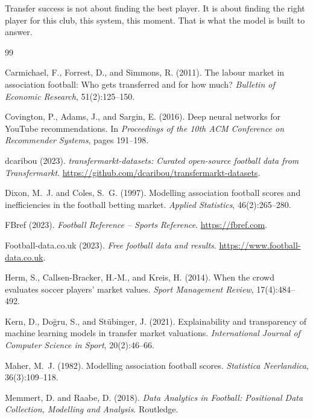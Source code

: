 \documentclass[12pt, a4paper, oneside]{report}
\begin{document}
Transfer success is not about finding the best player. It is about finding the right player for this club, this system, this moment. That is what the model is built to answer.


\begin{thebibliography}{99}

Carmichael, F., Forrest, D., and Simmons, R. (2011).
The labour market in association football: Who gets transferred and for how much?
\textit{Bulletin of Economic Research}, 51(2):125--150.

Covington, P., Adams, J., and Sargin, E. (2016).
Deep neural networks for YouTube recommendations.
In \textit{Proceedings of the 10th ACM Conference on Recommender Systems}, pages 191--198.

dcaribou (2023).
\textit{transfermarkt-datasets: Curated open-source football data from Transfermarkt}.
\url{https://github.com/dcaribou/transfermarkt-datasets}.

Dixon, M.~J. and Coles, S.~G. (1997).
Modelling association football scores and inefficiencies in the football betting market.
\textit{Applied Statistics}, 46(2):265--280.

FBref (2023).
\textit{Football Reference -- Sports Reference}.
\url{https://fbref.com}.

Football-data.co.uk (2023).
\textit{Free football data and results}.
\url{https://www.football-data.co.uk}.

Herm, S., Callsen-Bracker, H.-M., and Kreis, H. (2014).
When the crowd evaluates soccer players' market values.
\textit{Sport Management Review}, 17(4):484--492.

Kern, D., Doğru, S., and Stübinger, J. (2021).
Explainability and transparency of machine learning models in transfer market valuations.
\textit{International Journal of Computer Science in Sport}, 20(2):46--66.

Maher, M.~J. (1982).
Modelling association football scores.
\textit{Statistica Neerlandica}, 36(3):109--118.

Memmert, D. and Raabe, D. (2018).
\textit{Data Analytics in Football: Positional Data Collection, Modelling and Analysis}.
Routledge.


\end{thebibliography}
\end{document}
